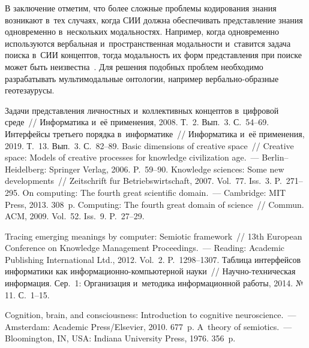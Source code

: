 \begin{multicols}{2}
  В заключение отметим, что более сложные проб\-ле\-мы кодирования знания 
возникают в~тех случаях, когда СИИ должна обеспечивать пред\-став\-ле\-ние 
знания одновременно в~нескольких модальностях. Например, когда 
одновременно используются вербальная и~про\-стран\-ст\-вен\-ная модальности 
и~ставится задача поиска в~СИИ концептов, тогда мо\-даль\-ность их форм 
пред\-став\-ле\-ния при поиске может быть неизвестна~\cite{28-zac}. Для решения 
подобных проб\-лем необходимо разрабатывать мультимодальные онтологии, 
например вер\-баль\-но-образ\-ные геотезаурусы.
  
 {\small\frenchspacing
 {%
 \begin{thebibliography}{99}
 Задачи представления личностных 
и~коллективных концептов в~цифровой среде~// Информатика и~её применения, 2008. Т.~2. 
Вып.~3. С.~54--69.
 Интерфейсы третьего порядка в~информатике~// Информатика и~её 
применения, 2019. Т.~13. Вып.~3. С.~82--89.
 Basic dimensions of creative space~// Creative space: Models 
of creative processes for knowledge civilization age.~--- Berlin--Heidelberg: Springer Verlag, 2006. 
P.~59--90.
 Knowledge sciences: Some new developments~// Zeitschrift 
f$\ddot{\mbox{u}}$r Betriebswirtschaft, 2007. Vol.~77. Iss.~3. P.~271--295.
 On computing: The fourth great scientific domain.~--- Cambridge: MIT Press, 
2013. 308~p.
 Computing: The fourth great domain of science~// 
Commun. ACM, 2009. Vol.~52. Iss.~9. P.~27--29.

 Tracing emerging meanings by computer: Semiotic framework~// 13th European 
Conference on Knowledge Management Proceedings.~--- Reading: Academic Publishing 
International Ltd., 2012. Vol.~2. P.~1298--1307.
 Таблица интерфейсов информатики как  
ин\-фор\-ма\-ци\-он\-но-компью\-тер\-ной науки~// На\-уч\-но-тех\-ни\-че\-ская информация. 
Сер.~1: Организация и~методика информационной работы, 2014. №\,11. С.~1--15.

 Cognition, brain, and consciousness: Introduction to cognitive 
neuroscience.~--- Amsterdam: Academic Press/Elsevier, 2010. 677~p.
 A~theory of semiotics.~--- Bloomington, IN, USA: Indiana University Press, 1976. 356~p.


\end{thebibliography}}}
\end{multicols}
